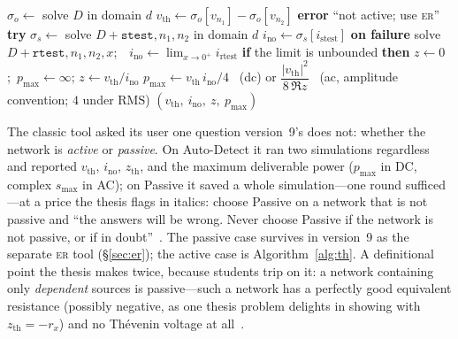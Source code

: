 \documentclass[11pt,oneside]{report}
\newcommand{\kw}[1]{\textsc{#1}}
\newcommand{\code}[1]{\texttt{#1}}
\begin{document}
\begin{algorithm}[htbp]
\caption{\kw{Thevenin}$(D, n_1, n_2, d)$: equivalent seen from a port}
\label{alg:th}
\begin{algorithmic}[1]
\State $\sigma_o \gets$ solve $D$ in domain $d$
\State $v_\mathrm{th} \gets \sigma_o[v_{n_1}] - \sigma_o[v_{n_2}]$
  \textbf{error} ``not active; use \kw{er}''
\EndIf
\State \textbf{try} $\sigma_s \gets$
  solve $D + \code{stest},n_1,n_2$ in domain $d$
\State \quad $i_\mathrm{no} \gets \sigma_s[i_\mathrm{stest}]$
\State \textbf{on failure} 
\State \quad solve $D + \code{rtest},n_1,n_2,x$;\ \
  $i_\mathrm{no} \gets \lim_{x \to 0^+} i_\mathrm{rtest}$
\State \quad \textbf{if} the limit is unbounded \textbf{then}
  $z \gets 0$;\ $p_\mathrm{max} \gets \infty$; \Return
\State $z \gets v_\mathrm{th} / i_\mathrm{no}$
\State $p_\mathrm{max} \gets v_\mathrm{th}\, i_\mathrm{no}/4$ \ (dc)
  \quad or \quad $\dfrac{|v_\mathrm{th}|^2}{8\,\Re z}$ \ (ac,
  amplitude convention; $4$ under RMS)
\State \Return $(v_\mathrm{th},\ i_\mathrm{no},\ z,\ p_\mathrm{max})$
\end{algorithmic}
\end{algorithm}

The classic tool asked its user one question version~9's does not:
whether the network is \emph{active} or \emph{passive}. On
Auto-Detect it ran two simulations regardless and reported
$v_\mathrm{th}$, $i_\mathrm{no}$, $z_\mathrm{th}$, and the maximum
deliverable power ($p_\mathrm{max}$ in DC, complex $s_\mathrm{max}$
in AC); on Passive it saved a whole simulation---one round
sufficed---at a price the thesis flags in italics: choose Passive on
a network that is not passive and ``the answers will be wrong. Never
choose Passive if the network is not passive, or if in
doubt''~\cite[\S5.2]{thesis2000}. The passive case survives in
version~9 as the separate \kw{er} tool (\S\ref{sec:er}); the active
case is Algorithm~\ref{alg:th}. A definitional point the thesis
makes twice, because students trip on it: a network containing only
\emph{dependent} sources is passive---such a network has a perfectly
good equivalent resistance (possibly negative, as one thesis problem
delights in showing with $z_\mathrm{th} = -r_x$) and no Th\'evenin
voltage at all~\cite[\S5.3, \S9.3]{thesis2000}.
\end{document}
